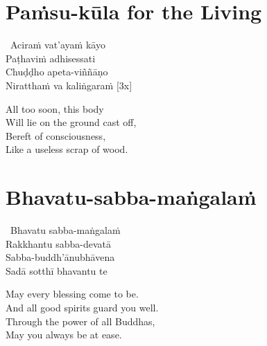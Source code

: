 \suttaRef{[Thai]}



\section{Paṁsu-kūla for the Living}
\label{pamsu-kula-living}

\begin{pali-hangtogether}
  \anglebracketleft\ \hspace{-0.5mm}Aciraṁ vat'ayaṁ kāyo \hspace{-0.5mm}\anglebracketright\ \\
  Paṭhaviṁ adhisessati\\
  Chuḍḍho apeta-viññāṇo\\
  Niratthaṁ va kaliṅgaraṁ \hfill{[3x]}
\end{pali-hangtogether}

\begin{english-verses}
  All too soon, this body\\
  Will lie on the ground cast off,\\
  Bereft of consciousness,\\
  Like a useless scrap of wood.
\end{english-verses}

\suttaRef{[Dhp 41]}



\section{Bhavatu-sabba-maṅgalaṁ}
\label{bhavatu-funeral}

\begin{pali-hangtogether}
  \anglebracketleft\ \hspace{-0.5mm}Bhavatu sabba-maṅgalaṁ \hspace{-0.5mm}\anglebracketright\ \\
  Rakkhantu sabba-devatā\\
  Sabba-buddh'ānubhāvena\\
  Sadā sotthī bhavantu te
\end{pali-hangtogether}

\begin{english-verses}
  May every blessing come to be.\\
  And all good spirits guard you well.\\
  Through the power of all Buddhas,\\
  May you always be at ease.
\end{english-verses}

